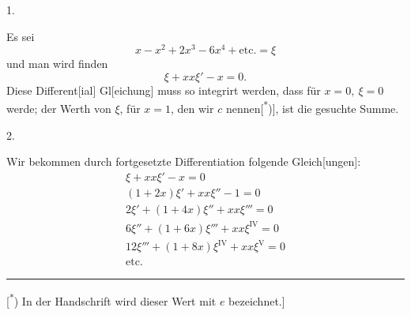 \clearpage\NoSourceHead{}
\begingroup
\makeatletter\tagsleft@true\let\veqno\@@leqno\makeatother
{}
\begin{center}1.\end{center}
\noindent\hspace*{\parindent}Es sei
\begin{equation}
x-x^2+2x^3-6x^4+\text{etc.}=\xi\tag*{[1]}
\end{equation}
\noindent und man wird finden
\begin{equation}
\xi+xx\xi'-x=0.\tag*{[2]}
\end{equation}
\noindent Diese Different[ial] Gl[eichung] muss so integrirt werden, dass für \(x=0,\ \xi=0\) werde; der Werth von \(\xi\), für \(x=1\), den wir \(c\) nennen[\textsuperscript{*})], ist die gesuchte Summe.
\begin{center}2.\end{center}
\noindent\hspace*{\parindent}Wir bekommen durch fortgesetzte Differentiation folgende Gleich[ungen]:
\[
\begin{gathered}
\xi+xx\xi'-x=0\\
(1+2x)\xi'+xx\xi''-1=0\\
2\xi'+(1+4x)\xi''+xx\xi'''=0\\
6\xi''+(1+6x)\xi'''+xx\xi^{\mathrm{IV}}=0\\
12\xi'''+(1+8x)\xi^{\mathrm{IV}}+xx\xi^{\mathrm{V}}=0\\
\text{etc.}
\end{gathered}
\]
\par\medskip\noindent\rule{.24\linewidth}{.4pt}\par\smallskip
{\small\noindent\hspace*{\parindent}[\textsuperscript{*}) In der Handschrift wird dieser Wert mit \(e\) bezeichnet.]\par}
\clearpage\endgroup
